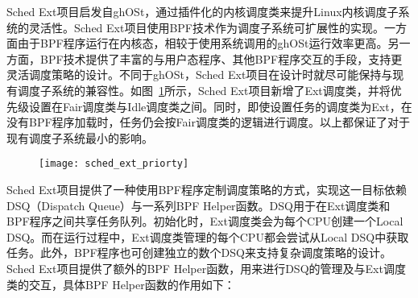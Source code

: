Sched Ext项目启发自ghOSt\citep{humphries2021ghost}，通过插件化的内核调度类来提升Linux内核调度子系统的灵活性。Sched Ext项目使用BPF技术作为调度子系统可扩展性的实现。一方面由于BPF程序运行在内核态，相较于使用系统调用的ghOSt运行效率更高。另一方面，BPF技术提供了丰富的与用户态程序、其他BPF程序交互的手段，支持更灵活调度策略的设计。不同于ghOSt，Sched Ext项目在设计时就尽可能保持与现有调度子系统的兼容性。如图~\ref{fig:sched_ext_priorty}所示，Sched Ext项目新增了Ext调度类，并将优先级设置在Fair调度类与Idle调度类之间。同时，即使设置任务的调度类为Ext，在没有BPF程序加载时，任务仍会按Fair调度类的逻辑进行调度。以上都保证了对于现有调度子系统最小的影响。 

\begin{figure}[!htbp]
    \centering
    \texttt{[image: sched\_ext\_priorty]}
    \label{fig:sched_ext_priorty}
\end{figure}

Sched Ext项目提供了一种使用BPF程序定制调度策略的方式，实现这一目标依赖DSQ（Dispatch Queue）与一系列BPF Helper函数。DSQ用于在Ext调度类和BPF程序之间共享任务队列。初始化时，Ext调度类会为每个CPU创建一个Local DSQ。而在运行过程中，Ext调度类管理的每个CPU都会尝试从Local DSQ中获取任务。此外，BPF程序也可创建独立的数个DSQ来支持复杂调度策略的设计。Sched Ext项目提供了额外的BPF Helper函数，用来进行DSQ的管理及与Ext调度类的交互，具体BPF Helper函数的作用如下：

